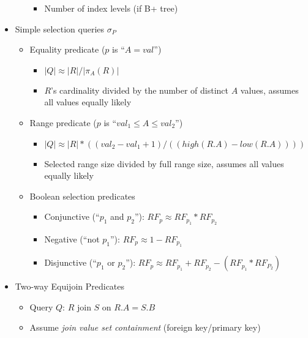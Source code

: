 \documentclass[landscape,8pt]{extarticle}
\begin{document}
\begin{multicols}{5}
\begin{itemize}
\begin{itemize}
\begin{itemize}
                            \item Number of index levels (if B+ tree)
                        \end{itemize}
              \end{itemize}
        \item Simple selection queries $\sigma_P$
              \begin{itemize}
                  \item Equality predicate ($p$ is ``$A = val$'')
                        \begin{itemize}
                            \item $|Q| \approx |R| / |\pi_A(R)|$
                            \item $R$'s cardinality divided by the number of distinct $A$ values, assumes all values equally likely
                        \end{itemize}
                  \item Range predicate ($p$ is ``$val_1 \leq A \leq val_2$'')
                        \begin{itemize}
                            \item $|Q| \approx |R| * ((val_2 - val_1 + 1) / ((high(R.A) - low(R.A))))$
                            \item Selected range size divided by full range size, assumes all values equally likely
                        \end{itemize}
                  \item Boolean selection predicates
                        \begin{itemize}
                            \item Conjunctive (``$p_1$ and $p_2$''): $RF_p \approx RF_{p_1} * RF_{p_2}$
                            \item Negative (``not $p_1$''): $RF_p \approx 1 - RF_{p_1}$
                            \item Disjunctive (``$p_1$ or $p_2$''): $RF_p \approx RF_{p_1} + RF_{p_2} - (RF_{p_1} * RF_{P_2})$
                        \end{itemize}
              \end{itemize}
        \item Two-way Equijoin Predicates
              \begin{itemize}
                  \item Query $Q$: $R$ join $S$ on $R.A = S.B$
                  \item Assume \emph{join value set containment} (foreign key/primary key)

\end{itemize}
\end{itemize}
\end{multicols}
\end{document}
